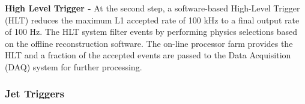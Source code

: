 {\bf High Level Trigger -} At the second step, a software-based High-Level Trigger (HLT) reduces the maximum L1 accepted rate of 100 kHz to a final output rate of 100 Hz. The HLT system filter events by performing physics selections based on the offline reconstruction software. The on-line processor farm provides the HLT and a fraction of the accepted events are passed to the Data Acquisition (DAQ) system for further processing.

\subsubsection{Jet Triggers}
\begin{comment}
\begin{figure}[!h]
\begin{center}
\vspace*{3mm} 
\hspace*{-5mm}
\texttt{[image: /home/anter/Desktop/Thesis/Figures/Jet\_trigger.png]}\\
\vspace*{4mm}
\caption[Muon]{Illustration of the available tower granularity for the L1 jet finding algorithm in the
central region, |η|<3 (left). The jet trigger uses a 3×3 calorimeter region sliding window technique which spans the full(η,φ)coverage of the calorimeter. The active tower patterns allowed for L1τjet candidates are shown on the right Work flow of the L1 trigger system \cite{Chatrchyan:2008aa}.}
\label{fig:Jettrigger}
\end{center}
\end{figure}
\end{comment}
